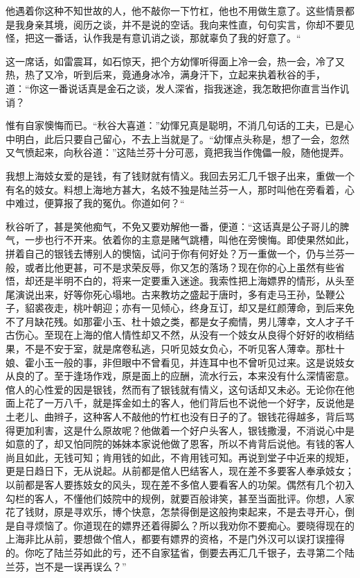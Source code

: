\documentclass[12pt,UTF8]{ctexbook}
\begin{document}
{{{他遇着你这种不知世故的人，他不敲你一下竹杠，他也不用做生意了。这些情景都是我身亲其境，阅历之谈，并不是说的空话。我向来性直，句句实言，你却不要见怪，把这一番话，认作我是有意讥诮之谈，那就辜负了我的好意了。“

这一席话，如雷震耳，如石惊天，把个方幼惲听得面上冷一会，热一会，冷了又热，热了又冷，听到后来，竟通身冰冷，满身汗下，立起来执着秋谷的手，道：“你这一番说话真是金石之谈，发人深省，指我迷途，我怎敢把你直言当作讥诮？

惟有自家懊悔而已。“秋谷大喜道：”幼惲兄真是聪明，不消几句话的工夫，已是心中明白，此后只要自己留心，不去上当就是了。“幼惲点头称是，想了一会，忽然又气愤起来，向秋谷道：”这陆兰芬十分可恶，竟把我当作傀儡一般，随他提弄。

我想上海妓女爱的是钱，有了钱财就有情义。我回去另汇几千银子出来，重做一个有名的妓女。料想上海地方甚大，名妓不独是陆兰芬一人，那时叫他在旁看着，心中难过，便算报了我的冤仇。你道如何？“

秋谷听了，甚是笑他痴气，不免又要劝解他一番，便道：“这话真是公子哥儿的脾气，一步也行不开来。依着你的主意是赌气跳槽，叫他在旁懊悔。即使果然如此，拼着自己的银钱去博别人的懊恼，试问于你有何好处？万一重做一个，仍与兰芬一般，或者比他更甚，可不是求荣反辱，你又怎的落场？现在你的心上虽然有些省悟，却还是半明不白的，将来一定要重入迷途。我索性把上海嫖界的情形，从头至尾演说出来，好等你死心塌地。古来教坊之盛起于唐时，多有走马王孙，坠鞭公子，貂裘夜走，桃叶朝迎；亦有一见倾心，终身互订，却又是红颜薄命，到后来免不了月缺花残。如那霍小玉、杜十娘之类，都是女子痴情，男儿薄幸，文人才子千古伤心。至现在上海的倌人情性却又不然，从没有一个妓女从良得个好好的收梢结果，不是不安于室，就是席卷私逃，只听见妓女负心，不听见客人薄幸。那杜十娘、霍小玉一般的事，非但眼中不曾看见，并连耳中也不曾听见过来。这是说妓女从良的了。至于逢场作戏，原是面上的应酬，流水行云，本来没有什么深情密意。倌人的心性爱的因是银钱，然而有了银钱就有情义，这句话却又未必。无论你在他面上花了一万八千，就是挥金如土的客人，他们背后也不说他一个好字，反说他是土老儿、曲辫子，这种客人不敲他的竹杠也没有日子的了。银钱花得越多，背后骂得更加利害，这是什么原故呢？他做着一个好户头客人，银钱撒漫，不消说心中是如意的了，却又怕同院的姊妹本家说他做了恩客，所以不肯背后说他。有钱的客人尚且如此，无钱可知；肯用钱的如此，不肯用钱可知。再说到堂子中近来的规矩，更是日趋日下，无从说起。从前都是倌人巴结客人，现在差不多要客人奉承妓女；以前都是客人要拣妓女的风头，现在差不多倌人要看客人的功架。偶然有几个初入勾栏的客人，不懂他们妓院中的规例，就要百般诽笑，甚至当面批评。你想，人家花了钱财，原是寻欢乐，博个快意，怎禁得倒是这般拘束起来，不是去寻开心，倒是自寻烦恼了。你道现在的嫖界还着得脚么？所以我劝你不要痴心。要晓得现在的上海非比从前，要想做个倌人，都要有嫖界的资格，不是门外汉可以误打误撞得的。你吃了陆兰芬如此的亏，还不自家猛省，倒要去再汇几千银子，去寻第二个陆兰芬，岂不是一误再误么？”

}}}
\end{document}

